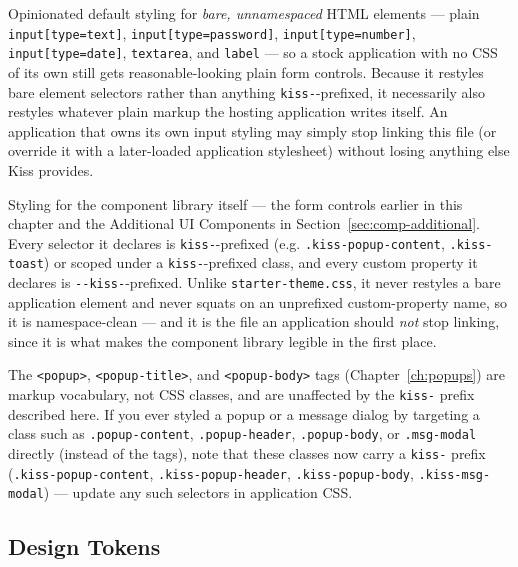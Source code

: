 \begin{description}[style=nextline]
  \item[\texttt{kiss/starter-theme.css}] Opinionated default styling for \emph{bare, unnamespaced} HTML elements --- plain \texttt{input[type=text]}, \texttt{input[type=password]}, \texttt{input[type=number]}, \texttt{input[type=date]}, \texttt{textarea}, and \texttt{label} --- so a stock application with no CSS of its own still gets reasonable-looking plain form controls.  Because it restyles bare element selectors rather than anything \texttt{kiss-}-prefixed, it necessarily also restyles whatever plain markup the hosting application writes itself.  An application that owns its own input styling may simply stop linking this file (or override it with a later-loaded application stylesheet) without losing anything else Kiss provides.
  \item[\texttt{kiss/Utils.css}] Styling for the component library itself --- the form controls earlier in this chapter and the Additional UI Components in Section~\ref{sec:comp-additional}.  Every selector it declares is \texttt{kiss-}-prefixed (e.g. \texttt{.kiss-popup-content}, \texttt{.kiss-toast}) or scoped under a \texttt{kiss-}-prefixed class, and every custom property it declares is \texttt{-{}-kiss-}-prefixed.  Unlike \texttt{starter-theme.css}, it never restyles a bare application element and never squats on an unprefixed custom-property name, so it is namespace-clean --- and it is the file an application should \emph{not} stop linking, since it is what makes the component library legible in the first place.
\end{description}

\begin{notebox}
The \texttt{<popup>}, \texttt{<popup-title>}, and \texttt{<popup-body>} tags (Chapter~\ref{ch:popups}) are markup vocabulary, not CSS classes, and are unaffected by the \texttt{kiss-} prefix described here.  If you ever styled a popup or a message dialog by targeting a class such as \texttt{.popup-content}, \texttt{.popup-header}, \texttt{.popup-body}, or \texttt{.msg-modal} directly (instead of the tags), note that these classes now carry a \texttt{kiss-} prefix (\texttt{.kiss-popup-content}, \texttt{.kiss-popup-header}, \texttt{.kiss-popup-body}, \texttt{.kiss-msg-modal}) --- update any such selectors in application CSS.
\end{notebox}

\subsection{Design Tokens}
\label{sec:comp-design-tokens}


